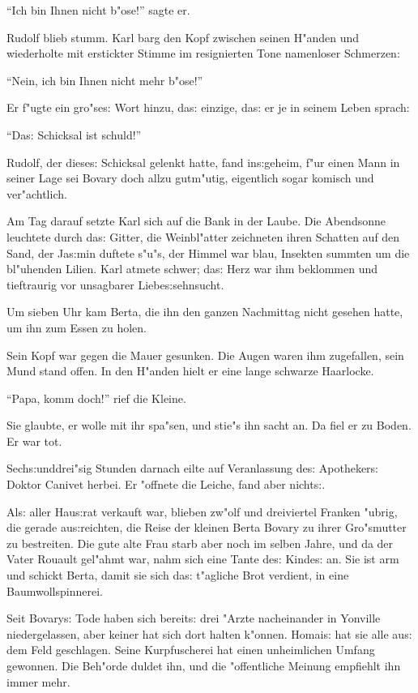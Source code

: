 \documentclass[oneside,12pt]{book}
\newcommand{\s}{s:}%
\begin{document}
"`Ich bin Ihnen nicht b"ose!"' sagte er.

Rudolf blieb stumm. Karl barg den Kopf zwischen seinen H"anden und
wiederholte mit erstickter Stimme im resignierten Tone namenloser
Schmerzen:

"`Nein, ich bin Ihnen nicht mehr b"ose!"'

Er f"ugte ein gro"se{\s} Wort hinzu, da{\s} einzige, da{\s} er je
in seinem Leben sprach:

"`Da{\s} Schicksal ist schuld!"'

Rudolf, der diese{\s} Schicksal gelenkt hatte, fand in{\s}geheim,
f"ur einen Mann in seiner Lage sei Bovary doch allzu gutm"utig,
eigentlich sogar komisch und ver"achtlich.

Am Tag darauf setzte Karl sich auf die Bank in der Laube. Die
Abendsonne leuchtete durch da{\s} Gitter, die Weinbl"atter
zeichneten ihren Schatten auf den Sand, der Ja{\s}min duftete
s"u"s, der Himmel war blau, Insekten summten um die bl"uhenden
Lilien. Karl atmete schwer; da{\s} Herz war ihm beklommen und
tieftraurig vor unsagbarer Liebe{\s}sehnsucht.

Um sieben Uhr kam Berta, die ihn den ganzen Nachmittag nicht
gesehen hatte, um ihn zum Essen zu holen.

Sein Kopf war gegen die Mauer gesunken. Die Augen waren ihm
zugefallen, sein Mund stand offen. In den H"anden hielt er eine
lange schwarze Haarlocke.

"`Papa, komm doch!"' rief die Kleine.

Sie glaubte, er wolle mit ihr spa"sen, und stie"s ihn sacht an. Da
fiel er zu Boden. Er war tot.

Sech{\s}unddrei"sig Stunden darnach eilte auf Veranlassung de{\s}
Apotheker{\s} Doktor Canivet herbei. Er "offnete die Leiche, fand
aber nicht{\s}.

Al{\s} aller Hau{\s}rat verkauft war, blieben zw"olf und
dreiviertel Franken "ubrig, die gerade au{\s}reichten, die Reise
der kleinen Berta Bovary zu ihrer Gro"smutter zu bestreiten. Die
gute alte Frau starb aber noch im selben Jahre, und da der Vater
Rouault gel"ahmt war, nahm sich eine Tante de{\s} Kinde{\s} an.
Sie ist arm und schickt Berta, damit sie sich da{\s} t"agliche
Brot verdient, in eine Baumwollspinnerei.

Seit Bovary{\s} Tode haben sich bereit{\s} drei "Arzte nacheinander
in Yonville niedergelassen, aber keiner hat sich dort halten
k"onnen. Homai{\s} hat sie alle au{\s} dem Feld geschlagen. Seine
Kurpfuscherei hat einen unheimlichen Umfang gewonnen. Die Beh"orde
duldet ihn, und die "offentliche Meinung empfiehlt ihn immer mehr.
\end{document}
